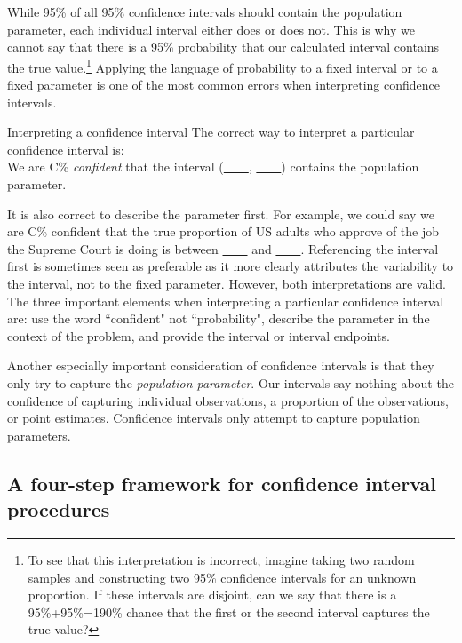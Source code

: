 While 95\% of all 95\% confidence intervals should contain the population parameter, each individual interval either does or does not.  This is why we cannot say that there is a 95\% probability that our calculated interval contains the true value.\footnote{To see that this interpretation is incorrect, imagine taking two random samples and constructing two 95\% confidence intervals for an unknown proportion. If these intervals are disjoint, can we say that there is a 95\%+95\%=190\% chance that the first or the second interval captures the true value?}  Applying the language of probability to a fixed interval or to a fixed parameter is one of the most common errors when interpreting confidence intervals. 

\begin{onebox}{Interpreting a confidence interval}
The correct way to interpret a particular confidence interval is:\\

We are C\% \emph{confident} that the interval (\underline{\ \ \ \ }, \underline{\ \ \ \ }) contains the population parameter.
\end{onebox}

It is also correct to describe the parameter first.  For example, we could say we are C\% confident that the true proportion of US adults who approve of the job the Supreme Court is doing is between \underline{\ \ \ \ } and \underline{\ \ \ \ }.  Referencing the interval first is sometimes seen as preferable as it more clearly attributes the variability to the interval, not to the fixed parameter.  However, both interpretations are valid.  The three important elements when interpreting a particular confidence interval are: use the word ``confident" not ``probability", describe the parameter in the context of the problem, and provide the interval or interval endpoints.

Another especially important consideration of confidence intervals is that they only try to capture the \emph{population parameter}. Our intervals say nothing about the confidence of capturing individual observations, a proportion of the observations, or point estimates. Confidence intervals only attempt to capture population parameters.


\newpage
\subsection{A four-step framework for confidence interval procedures}

